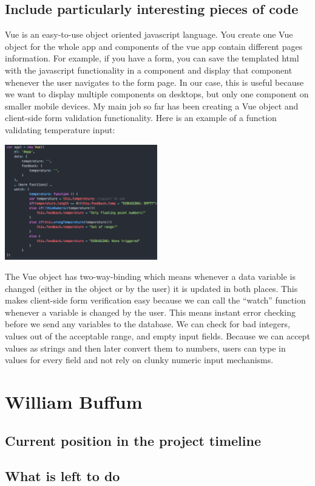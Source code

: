 \documentclass[draftclsnofoot,onecolumn,letterpaper,10pt,compsoc]{IEEEtran}
\begin{document}
\subsection{Include particularly interesting pieces of code}
Vue is an easy-to-use object oriented javascript language. You create one Vue object for the whole app and components of the vue app contain different pages information. For example, if you have a form, you can save the templated html with the javascript functionality in a component and display that component whenever the user navigates to the form page. In our case, this is useful because we want to display multiple components on desktops, but only one component on smaller mobile devices. 
My main job so far has been creating a Vue object and client-side form validation functionality. Here is an example of a function validating temperature input:


\centerline{\includegraphics[height=5cm]{screenshots/vuecode.png}}

The Vue object has two-way-binding which means whenever a data variable is changed (either in the object or by the user) it is updated in both places. This makes client-side form verification easy because we can call the “watch” function whenever a variable is changed by the user. This means instant error checking before we send any variables to the database. We can check for bad integers, values out of the acceptable range, and empty input fields. Because we can accept values as strings and then later convert them to numbers, users can type in values for every field and not rely on clunky numeric input mechanisms.

\section{William Buffum}
\subsection{Current position in the project timeline}
\subsection{What is left to do}
\end{document}
